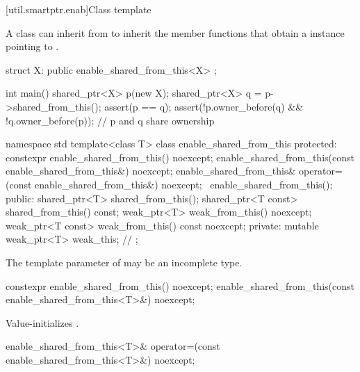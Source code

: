[util.smartptr.enab]{Class template }

\pnum
{}%
A class  can inherit from 
to inherit the  member functions that obtain
a  instance pointing to .

\pnum
\begin{example}
\begin{codeblock}
struct X: public enable_shared_from_this<X> { };

int main() {
  shared_ptr<X> p(new X);
  shared_ptr<X> q = p->shared_from_this();
  assert(p == q);
  assert(!p.owner_before(q) && !q.owner_before(p)); // p and q share ownership
}
\end{codeblock}
\end{example}

\begin{codeblock}
namespace std {
  template<class T> class enable_shared_from_this {
  protected:
    constexpr enable_shared_from_this() noexcept;
    enable_shared_from_this(const enable_shared_from_this&) noexcept;
    enable_shared_from_this& operator=(const enable_shared_from_this&) noexcept;
    ~enable_shared_from_this();
  public:
    shared_ptr<T> shared_from_this();
    shared_ptr<T const> shared_from_this() const;
    weak_ptr<T> weak_from_this() noexcept;
    weak_ptr<T const> weak_from_this() const noexcept;
  private:
    mutable weak_ptr<T> weak_this; // \expos
  };
}
\end{codeblock}

\pnum
The template parameter  of 
may be an incomplete type.

%
\begin{itemdecl}
constexpr enable_shared_from_this() noexcept;
enable_shared_from_this(const enable_shared_from_this<T>&) noexcept;
\end{itemdecl}

\begin{itemdescr}
\pnum\effects  Value-initializes .
\end{itemdescr}

%
\begin{itemdecl}
enable_shared_from_this<T>& operator=(const enable_shared_from_this<T>&) noexcept;
\end{itemdecl}

